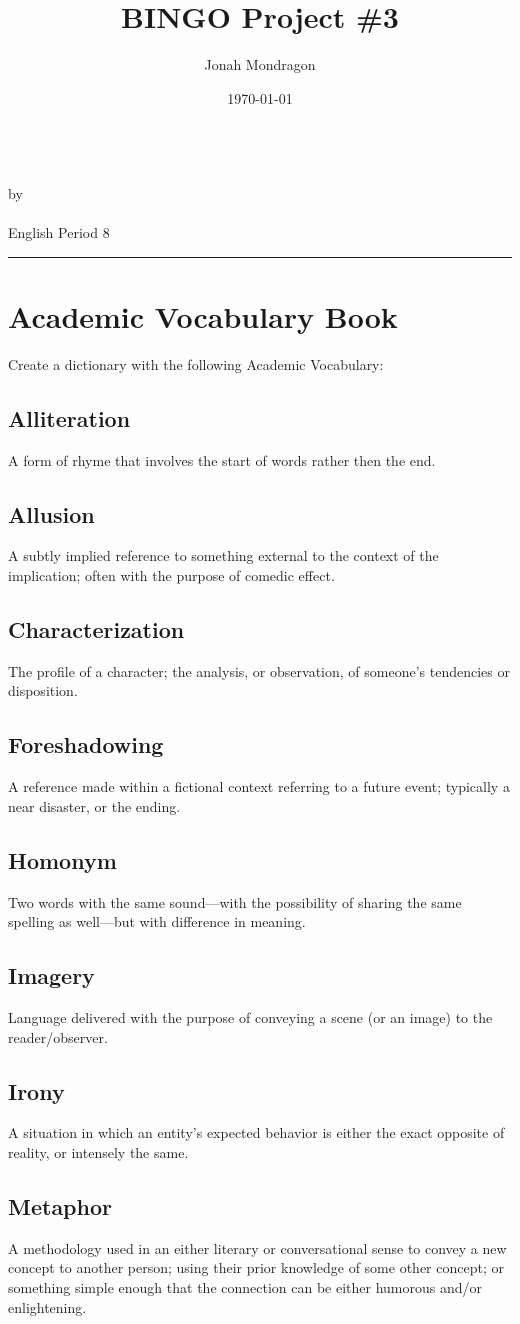\documentclass{article}
\title{BINGO Project \#3}
\author{Jonah Mondragon}
\date{\today}
\newcommand{\PutTitle}[1]
{
    \begin{center}
        {\huge\bfseries\thetitle}\\
        by \theauthor\\
        \thedate\\
        #1        
    \end{center}
    \hrule
    \vspace{2ex}
}
\begin{document}
\PutTitle{English Period 8}
\pagestyle{headings}
\thispagestyle{empty}

\section{Academic Vocabulary Book}
Create a dictionary with the following Academic Vocabulary:
\begin{addmargin}[0.5in]{0in}
    \subsection*{Alliteration}
        A form of rhyme that involves the start of words rather then the end.
    \subsection*{Allusion}
        A subtly implied reference to something external to the context of the implication; often with the purpose of comedic
        effect.
    \subsection*{Characterization}
        The profile of a character; the analysis, or observation, of someone's tendencies or disposition.
    \subsection*{Foreshadowing}
        A reference made within a fictional context referring to a future event; typically a near disaster, or the ending. 
    \subsection*{Homonym}
        Two words with the same sound---with the possibility of sharing the same spelling as well---but with difference in
        meaning.
    \subsection*{Imagery} 
        Language delivered with the purpose of conveying a scene (or an image) to the reader/observer.
    \subsection*{Irony}
        A situation in which an entity's expected behavior is either the exact opposite of reality, or intensely the same.
    \subsection*{Metaphor}
        A methodology used in an either literary or conversational sense to convey a new concept to another person; using 
        their prior knowledge of some other concept; or something simple enough that the connection can be either humorous
        and/or enlightening.

\end{addmargin}
\end{document}

